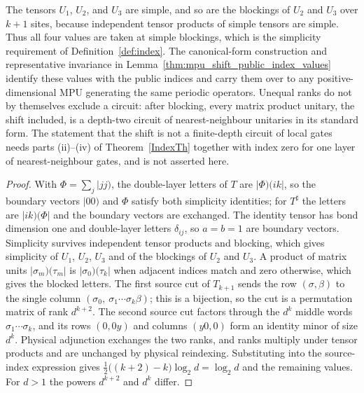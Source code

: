 \begin{lemma}
    The tensors $U_1$, $U_2$, and $U_3$ are simple, and so are the blockings
    of $U_2$ and $U_3$ over $k+1$ sites, because independent tensor products
    of simple tensors are simple. Thus all four values are taken at simple
    blockings, which is the simplicity requirement of Definition~\ref{def:index}.
    The canonical-form construction and representative invariance in
    Lemma~\ref{thm:mpu_shift_public_index_values} identify these values with
    the public indices and carry them over to any positive-dimensional MPU
    generating the same periodic operators. Unequal ranks do not by
    themselves exclude a circuit: after blocking, every matrix product unitary,
    the shift included, is a depth-two circuit of nearest-neighbour unitaries
    in its standard form. The statement that the shift is not a finite-depth
    circuit of local gates needs parts (ii)--(iv) of Theorem~\ref{IndexTh}
    together with index zero for one layer of nearest-neighbour gates, and is
    not asserted here.
\end{lemma}

\begin{proof}\leanok
    With $\Phi=\sum_j|jj)$, the double-layer letters of $T$ are
    $|\Phi)(ik|$, so the boundary vectors $|00)$ and $\Phi$ satisfy both
    simplicity identities; for $T^\sharp$ the letters are $|ik)(\Phi|$ and the
    boundary vectors are exchanged. The identity tensor has bond dimension
    one and double-layer letters $\delta_{ij}$, so $a=b=1$ are boundary
    vectors. Simplicity survives independent tensor products and blocking,
    which gives simplicity of $U_1$, $U_2$, $U_3$ and of the blockings of
    $U_2$ and $U_3$. A product
    of matrix units $|\sigma_m)(\tau_m|$ is $|\sigma_0)(\tau_k|$ when adjacent
    indices match and zero otherwise, which gives the blocked letters. The
    first source cut of $T_{k+1}$ sends the row $(\sigma,\beta)$ to the single
    column $(\sigma_0,\ \sigma_1\cdots\sigma_k\beta)$; this is a bijection, so
    the cut is a permutation matrix of rank $d^{k+2}$. The second source cut
    factors through the $d^k$ middle words $\sigma_1\cdots\sigma_k$, and its
    rows $(0,0y)$ and columns $(y0,0)$ form an identity minor of size $d^k$.
    Physical adjunction exchanges the two ranks, and ranks multiply under
    tensor products and are unchanged by physical reindexing. Substituting
    into the source-index expression gives
    $\frac12\bigl((k+2)-k\bigr)\log_2 d=\log_2 d$ and the remaining values.
    For $d>1$ the powers $d^{k+2}$ and $d^k$ differ.
\end{proof}

